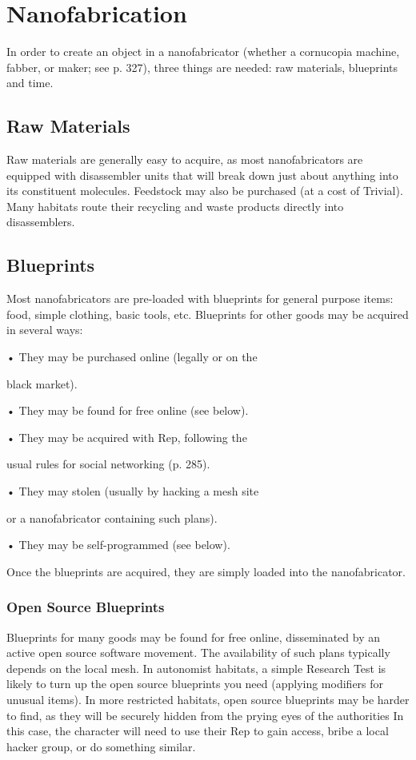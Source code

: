 \section{Nanofabrication}

In order to create an object in a nanofabricator 
(whether a cornucopia machine, fabber, or maker; see 
p. 327), three things are needed: raw materials, blueprints
and time.

\subsection{Raw Materials}

Raw materials are generally easy to acquire, as most 
nanofabricators are equipped with disassembler units 
that will break down just about anything into its constituent
molecules. Feedstock may also be purchased
(at a cost of Trivial). Many habitats route their recycling
and waste products directly into disassemblers.

\subsection{Blueprints}

Most nanofabricators are pre-loaded with blueprints 
for general purpose items: food, simple clothing, basic 
tools, etc. Blueprints for other goods may be acquired 
in several ways:

•  They may be purchased online (legally or on the 

black market).

•  They may be found for free online (see below).

•  They may be acquired with Rep, following the 

usual rules for social networking (p. 285).

•  They may stolen (usually by hacking a mesh site 

or a nanofabricator containing such plans).

•  They may be self-programmed (see below).

Once the blueprints are acquired, they are simply 
loaded into the nanofabricator.

\subsubsection{Open Source Blueprints}

Blueprints for many goods may be found for free 
online, disseminated by an active open source 
software movement. The availability of such plans 
typically depends on the local mesh. In autonomist 
habitats, a simple Research Test is likely to turn up the 
open source blueprints you need (applying modifiers 
for unusual items). In more restricted habitats, open 
source blueprints may be harder to find, as they will 
be securely hidden from the prying eyes of the authorities
In this case, the character will need to use their
Rep to gain access, bribe a local hacker group, or do 
something similar.

